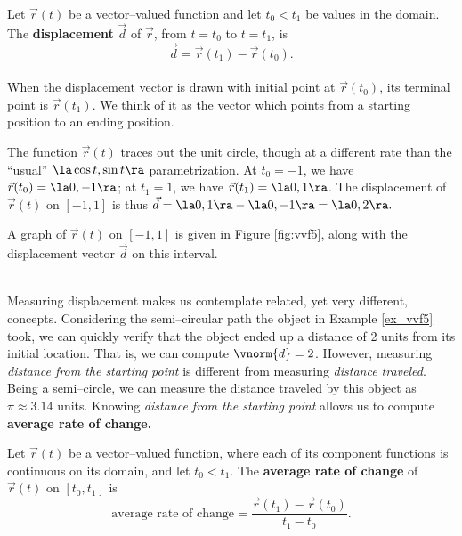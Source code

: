 {Let $\vec r(t)$ be a vector--valued function and let $t_0<t_1$ be values in the domain. The \textbf{displacement} $\vec d$ of $\vec r$, from $t=t_0$ to $t=t_1$, is $$\vec d=\vec r(t_1)-\vec r(t_0).$$
}\\

When the displacement vector is drawn with initial point at $\vec r(t_0)$, its terminal point is $\vec r(t_1)$. We think of it as the vector which points from a starting position to an ending position.\\

{The function $\vec r(t)$ traces out the unit circle, though at a different rate than the ``usual'' $\la \cos t,\sin t\ra$ parametrization. At $t_0=-1$, we have $\vec r(t_0) = \la 0,-1\ra$; at $t_1=1$, we have $\vec r(t_1) = \la 0,1\ra$. The displacement of $\vec r(t)$ on $[-1,1]$ is thus $\vec d = \la 0,1\ra - \la 0,-1\ra = \la 0,2\ra.$

A graph of $\vec r(t)$ on $[-1,1]$ is given in Figure \ref{fig:vvf5}, along with the displacement vector $\vec d$ on this interval.
}\\

Measuring displacement makes us contemplate related, yet very different, concepts. Considering the semi--circular path the object in Example \ref{ex_vvf5} took, we can quickly verify that the object ended up a distance of 2 units from its initial location. That is, we can compute $\vnorm{d} = 2$. However, measuring \emph{distance from the starting point} is different from measuring \emph{distance traveled}. Being a semi--circle, we can measure the distance traveled by this object as $\pi\approx 3.14$ units. Knowing \emph{distance from the starting point} allows us to compute \textbf{average rate of change.}

{Let $\vec r(t)$ be a vector--valued function, where each of its component functions is continuous on its domain, and let $t_0<t_1$. The \textbf{average rate of change} of $\vec r(t)$ on $[t_0,t_1]$ is
$$\text{average rate of change} = \frac{\vec r(t_1) - \vec r(t_0)}{t_1-t_0}.$$
}\\

